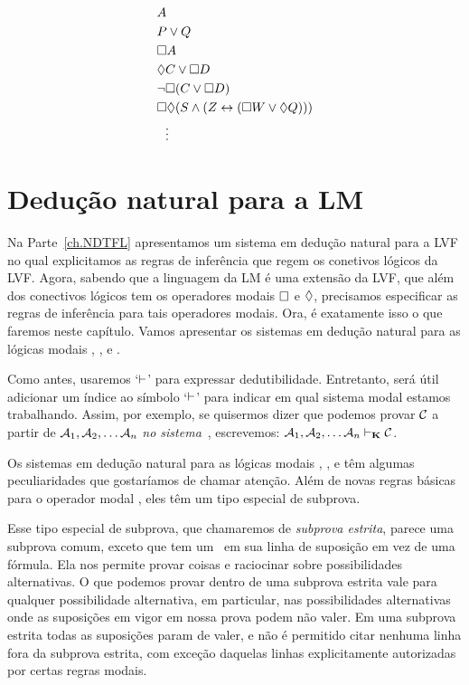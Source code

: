  \begin{align*}
			& A \\
			& P\vee Q \\
			& \Box A \\
			& \Diamond C\vee \Box D \\
			& \neg\Box(C\vee \Box D) \\
			& \Box\Diamond (S\wedge (Z\leftrightarrow (\Box W \vee \Diamond Q))) \\
			& \ \ \vdots
	\end{align*}
 
   
\chapter{Dedução natural para a LM}
\label{Proof}

Na Parte~\ref{ch.NDTFL}  apresentamos um sistema em dedução natural para a LVF no qual explicitamos as regras de inferência que regem os conetivos lógicos da  LVF.  Agora, sabendo que a linguagem da LM é uma extensão da LVF,  que além dos conectivos lógicos tem os operadores modais   $\Box$ e $\Diamond$,  precisamos especificar as regras de inferência para tais operadores modais. Ora, é exatamente isso o que faremos neste capítulo. Vamos apresentar os sistemas em dedução  natural  para as lógicas modais  \mlK, \mlT, \mlSfour{} e \mlSfive.

Como  antes,  usaremos `$\vdash$' para expressar dedutibilidade. Entretanto, será útil adicionar um índice ao símbolo  `$\vdash$' para indicar em qual sistema modal estamos trabalhando. Assim, por exemplo, se quisermos dizer que podemos provar $\mathcal{C}$ a partir de $\mathcal{A}_1,\mathcal{A}_2, \dots \mathcal{A}_n$ \emph{no sistema}~\mlK, escrevemos: $\mathcal{A}_1,\mathcal{A}_2, \dots \mathcal{A}_n \vdash_{\mathbf{K}} \mathcal{C}$.

Os sistemas em dedução natural para as lógicas modais \mlK, \mlT, \mlSfour{} e \mlSfive{} têm algumas peculiaridades que gostaríamos de chamar atenção. Além de novas regras básicas para o operador modal \ebox{}, eles têm um tipo especial de subprova. 

 Esse  tipo especial de subprova, que chamaremos de  \emph{subprova estrita}, parece uma subprova comum, exceto que tem um~\ebox{} em sua linha de suposição em vez de uma fórmula. Ela nos permite provar coisas e raciocinar sobre possibilidades alternativas. 
 O que podemos provar dentro de uma subprova estrita vale para qualquer possibilidade alternativa, em particular, nas possibilidades alternativas onde as suposições em vigor em nossa prova podem não valer. Em uma subprova estrita todas as suposições param de valer, e não é permitido citar nenhuma linha fora da subprova estrita, com exceção daquelas linhas explicitamente autorizadas por certas regras modais.

